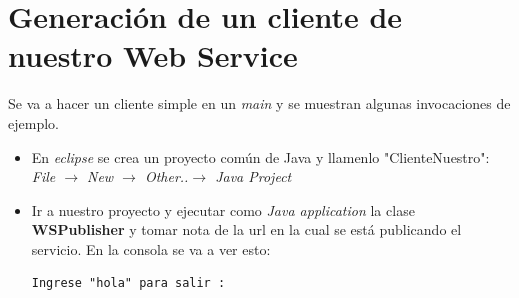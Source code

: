 \documentclass[12pt]{article}
\begin{document}
\section{Generaci\'on de un cliente de nuestro Web Service}
Se va a hacer un cliente simple en un \emph{main} y se muestran algunas invocaciones de ejemplo.
\begin{itemize}
\item En \emph{eclipse} se crea un proyecto com\'un de Java y llamenlo "ClienteNuestro": \newline
\emph{File $\rightarrow$ New $\rightarrow$  Other..$\rightarrow$ Java Project} \newline
    \begin{minipage}[t]{\linewidth}
          \raggedright

          \medskip
    \end{minipage}
\item Ir a nuestro proyecto y ejecutar como \emph{Java application} la clase \textbf{WSPublisher} y tomar nota de la url en la cual se est\'a publicando el servicio. En la consola se va a ver esto: 
\begin{verbatim}
Ingrese "hola" para salir : 
\end{verbatim}
    \begin{minipage}[t]{\linewidth}
          \raggedright


\end{minipage}
\end{itemize}
\end{document}
